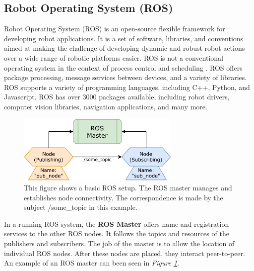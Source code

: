 \subsection{Robot Operating System (ROS)}
Robot Operating System (ROS)\cite{noauthor_rosorg_nodate} is an open-source flexible framework for developing robot applications. It is a set of software, libraries, and conventions aimed at making the challenge of developing dynamic and robust robot actions over a wide range of robotic platforms easier. ROS is not a conventional operating system in the context of process control and scheduling \cite{quigley_ros_2009}. ROS offers package processing, message services between devices, and a variety of libraries. ROS supports a variety of programming languages, including C++, Python, and Javascript. ROS has over 3000 packages available, including robot drivers, computer vision libraries, navigation applications, and many more.

\begin{figure}[h]%
  \centering
  \includegraphics[width=0.7\textwidth]{graphics/rosmaster.pdf}
  \caption{This figure shows a basic ROS setup. The ROS master manages and establishes node connectivity. The correspondence is made by the subject /some\_topic in this example.}
  \label{fig:rosmaster}
\end{figure}

In a running ROS system, the \textbf{ROS Master} offers name and registration services to the other ROS nodes. It follows the topics and resources of the publishers and subscribers. The job of the master is to allow the location of individual ROS nodes. After these nodes are placed, they interact peer-to-peer\cite{wu_master_2018}. An example of an ROS master can been seen in \textit{Figure \ref{fig:rosmaster}}.


